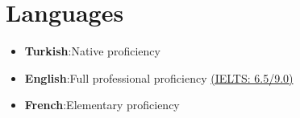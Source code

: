 \documentclass[a4paper,11pt]{article}
\newcommand{\resumeItem}[2]{
    \item{\textbf{#1}{:\hspace{0.5mm}#2 \vspace{-0.5mm}}}
}
\newcommand{\resumeSubItem}[2]{\resumeItem{#1}{#2}\vspace{-4pt}}
\newcommand{\resumeHeadingSkillStart}{\begin{itemize}[leftmargin=*,itemsep=1.7mm, rightmargin=2ex]}
\newcommand{\resumeHeadingSkillEnd}{\end{itemize}\vspace{-2mm}}
\begin{document}

\section{\textbf{Languages}}
\vspace{1.5mm}
    \resumeHeadingSkillStart
        \resumeSubItem{Turkish} {Native proficiency}
        \resumeSubItem{English} {Full professional proficiency {\href{https://drive.google.com/file/d/1jKMRSpP3VZ0Qj-F9RZ2jfN7uosiKkEt6/view}{(IELTS: 6.5/9.0)}}}
        \resumeSubItem{French} {Elementary proficiency}
    \resumeHeadingSkillEnd

\vspace{-1mm}

\begin{comment}

\section{\textbf{Courses Taken}}
\resumeHeadingSkillStart
    \resumeSubItem{CS \& Maths}
        {Algorithms and Programming I, Algorithms and Programming II, C Project, Calculus I, Calculus II, Computer Organization, Digital Design, Discrete and Combinatorial Mathematics, Fundamental Structures of Computer Science I, Fundamental Structures of Computer Science II, Linear Algebra and Differential Equations, Networks Computing, Object-Oriented Programming in Java, Operating Systems, Probabilities, Processor Architecture, Programming Languages, Algorithms I, Database Systems}
    \resumeSubItem{Others}
        {Asserting Oneself, Cultures Civilizations and Ideas I, Cultures Civilizations and Ideas II, Design Sprint, Digital Signal Processing \& Applications, English, English and Composition I, English and Composition II, French as a Foreign Language, General Physics I, General Physics II, History of Turkey, Introduction to Modern Biology, Turkish I, Turkish II, 	Science Technology and Society, Technical Report Writing and Presentation}
\resumeHeadingSkillEnd
\vspace{-1mm}
\end{comment}

\end{document}
